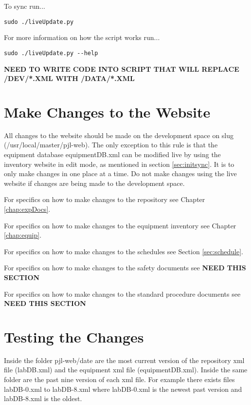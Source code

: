 \documentclass[justified]{LabArx1_5}
\begin{document}
\noindent To sync run...
\begin{lstlisting}[backgroundcolor = \color{light-gray}]
sudo ./liveUpdate.py
\end{lstlisting}
\vspace{-1em}
\noindent For more information on how the script works run...

\begin{lstlisting}[backgroundcolor = \color{light-gray}]
sudo ./liveUpdate.py --help
\end{lstlisting}

{\bf NEED TO WRITE CODE INTO SCRIPT THAT WILL REPLACE /DEV/*.XML WITH /DATA/*.XML}

\section{Make Changes to the Website}\label{sec:makeChanges}

All changes to the website should be made on the development space on slug (/usr/local/master/pjl-web). The only exception to this rule is that the equipment database equipmentDB.xml can be modified live by using the inventory website in edit mode, as mentioned in section \ref{sec:initsync}. It is to only make changes in one place at a time. Do not make changes using the live website if changes are being made to the development space. 

For specifics on how to make changes to the repository see Chapter \ref{chap:expDocs}.

For specifics on how to make changes to the equipment inventory see Chapter \ref{chap:equip}.

For specifics on how to make changes to the schedules see Section \ref{sec:schedule}.

For specifics on how to make changes to the safety documents see {\bf NEED THIS SECTION}

For specifics on how to make changes to the standard procedure documents see {\bf NEED THIS SECTION}

\section{Testing the Changes}\label{sec:testingChanges}

Inside the folder pjl-web/date are the most current version of the repository xml file (labDB.xml) and the equipment xml file (equipmentDB.xml). Inside the same folder are the past nine version of each xml file. For example there exists files labDB-0.xml to labDB-8.xml where labDB-0.xml is the newest past version and labDB-8.xml is the oldest. 
\end{document}
